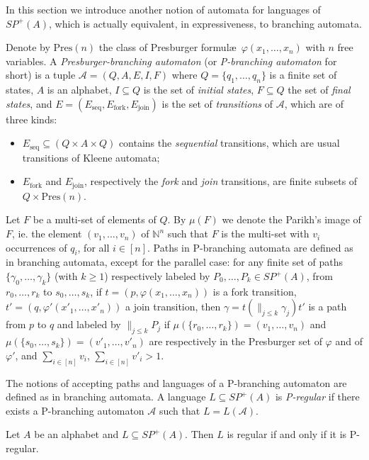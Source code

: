 \documentclass{CSML}
\begin{document}
In this section we introduce another notion of automata for languages of $SP^+(A)$, which is actually equivalent, in expressiveness, to branching automata.

Denote by $\text{Pres}(n)$ the class of Presburger formul\ae\ $\varphi(x_1,\dots,x_n)$ with $n$ free variables.
A \emph{Presburger-branching automaton} (or \emph{P-branching automaton} for short) is a tuple $\mathcal{A}=(Q, A, E, I, F)$ where $Q=\{q_1,\dots,q_n\}$ is a finite set of
states, $A$ is an alphabet, $I\subseteq Q$ is the set of \emph{initial states},
$F\subseteq Q$ the set of \emph{final states}, and $E=(E_\text{seq}, E_\text{fork}, E_\text{join})$ is the set of \emph{transitions} of ${\mathcal A}$, which are of three kinds:
\begin{itemize}
\item $E_\text{seq}\subseteq (Q\times A\times Q)$ contains the \emph{sequential} transitions, which are usual transitions of Kleene automata;
\item $E_\text{fork}$ and $E_\text{join}$, respectively the \emph{fork} and \emph{join} transitions, are finite subsets of $Q\times \text{Pres}(n)$.
\end{itemize}

Let $F$ be a multi-set of elements of $Q$. By $\mu(F)$ we denote the Parikh's image of $F$, ie. the element $(v_1,\dots,v_n)$ of $\mathbb{N}^n$ such that $F$ is the multi-set with $v_i$ occurrences of $q_i$, for all $i\in[n]$. 
Paths in P-branching automata are defined as in branching automata, except for the parallel case: 
for any finite set of paths $\{\gamma_0,\dots,\gamma_k\}$ (with $k\geq 1$) respectively labeled by $P_0,\dots,P_k\in SP^+(A)$, from $r_0,\dots,r_k$ to $s_0,\dots, s_k$, if $t=(p,\varphi(x_1,\dots,x_{n}))$ is a fork transition, $t'=(q,\varphi'(x'_1,\dots,x'_n))$ a join transition, then $\gamma=t(\parallel_{j\leq k} \gamma_j)t'$ is a path from $p$ to $q$ and labeled by $\parallel_{j\leq k} P_j$ if $\mu(\{r_0,\dots,r_k\})=(v_1,\dots,v_n)$ and $\mu(\{s_0,\dots,s_k\})=(v'_1,\dots,v'_n)$ are respectively in the Presburger set of $\varphi$ and of $\varphi'$, and $\sum_{i\in[n]}v_i$, $\sum_{i\in[n]}v'_i>1$.

The notions of accepting paths and languages of a P-branching automaton are defined as in branching automata. A language $L\subseteq SP^+(A)$ is \emph{P-regular} if there exists a P-branching automaton $\mathcal{A}$ such that $L=L(\mathcal{A})$.

\begin{thm}
  Let $A$ be an alphabet and $L\subseteq SP^+(A)$.
  Then $L$ is regular if and only if it is P-regular.
\end{thm}
\end{document}

